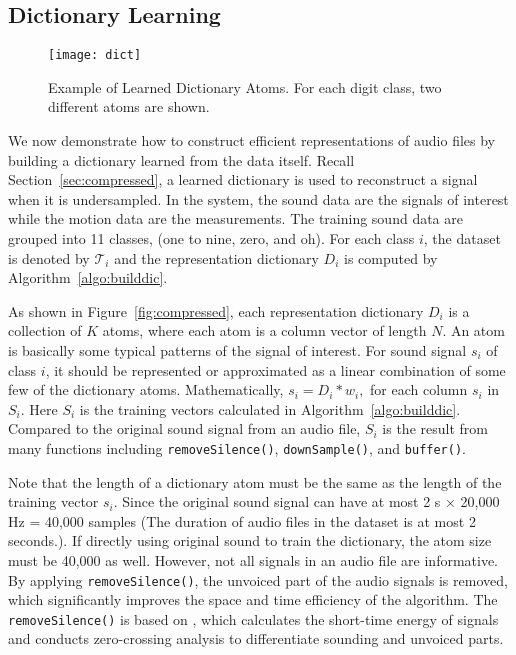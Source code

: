 \subsection{Dictionary Learning}\label{sec:design:dict}

\begin{figure*}[ht]
	\centering
	\texttt{[image: dict]}
	\caption{Example of Learned Dictionary Atoms. For each digit class, two different atoms are shown.}\label{fig:atoms}
\end{figure*}

We now demonstrate how to construct efficient representations of audio files by building a dictionary learned from the data itself. 
Recall Section~\ref{sec:compressed}, a learned dictionary is used to reconstruct a signal when it is undersampled. 
%
In the {\systemName} system, the sound data are the signals of interest while the motion data are the measurements. The training sound data are grouped into 11 classes, (one to nine, zero, and oh). For each class $i$, the dataset is denoted by $\mathcal{T}_i$ and the representation dictionary $D_i$ is computed by Algorithm~\ref{algo:builddic}.

As shown in Figure~\ref{fig:compressed}, each representation dictionary $D_i$ is a collection of $K$ atoms, where each atom is a column vector of length $N$. An atom is basically some typical patterns of the signal of interest. For sound signal $s_i$ of class $i$,
it should be represented or approximated as a linear combination of some few of the dictionary atoms. Mathematically,
	$s_i = D_i * w_i,$
for each column $s_i$ in $S_i$. Here $S_i$ is the training vectors calculated in Algorithm~\ref{algo:builddic}. Compared to the original sound signal from an audio file, $S_i$ is the result from many functions including \verb|removeSilence()|, \verb|downSample()|, and \verb|buffer()|. 
 
 
 
Note that the length of a dictionary atom must be the same as the length of the training vector $s_i$. Since the original sound signal can have at most 2 s $\times$ 20,000 Hz = 40,000 samples (The duration of audio files in the dataset is at most 2 seconds.). If directly using original sound to train the dictionary, the atom size must be 40,000 as well. However, not all signals in an audio file are informative. By applying \verb|removeSilence()|, the unvoiced part of the audio signals is removed, which significantly improves the space and time efficiency of the algorithm. The \verb|removeSilence()| is based on \cite{rabiner2011theory}, which calculates the short-time energy of signals and conducts zero-crossing analysis to differentiate sounding and unvoiced parts.
 
